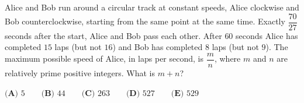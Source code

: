 Alice and Bob run around a circular track at constant speeds, Alice clockwise and Bob counterclockwise, starting from the same point at the same time. Exactly $\dfrac{70}{27}$ seconds after the start, Alice and Bob pass each other. After $60$ seconds Alice has completed $15$ laps (but not $16$) and Bob has completed $8$ laps (but not $9$). The maximum possible speed of Alice, in laps per second, is $\dfrac {m}{n}$, where $m$ and $n$ are relatively prime positive integers. What is $m+n$?

$\textbf{(A) } 5 \qquad \textbf{(B) } 44 \qquad \textbf{(C) } 263 \qquad \textbf{(D) } 527 \qquad \textbf{(E) } 529$
